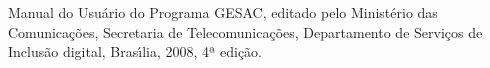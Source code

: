\documentclass[
12pt,		%
openright,	%
twoside,  %
a4paper,			%
chapter=TITLE,		%
english,			%
french,				%
spanish,			%
brazil				%
]{USPSC-classe/USPSC}
\begin{document}
\begin{flushleft}
\begin{flushleft}
\begin{flushleft}
\begin{flushleft}
\begin{flushleft}
\begin{flushleft}
\begin{flushleft}
\begin{flushleft}
\begin{flushleft}
\begin{flushleft}
[MC, 2008] Manual do Usu\'ario do Programa GESAC, editado pelo Minist\'erio das Comunica\c{c}\~oes, Secretaria de Telecomunica\c{c}\~oes, Departamento de Servi\c{c}os de Inclus\~ao digital,  Bras\'{\i}lia, 2008, 4ª edi\c{c}\~ao.
\end{flushleft}


\end{flushleft}


\end{flushleft}


\end{flushleft}


\end{flushleft}


\end{flushleft}


\end{flushleft}


\end{flushleft}


\end{flushleft}


\end{flushleft}
\end{document}
